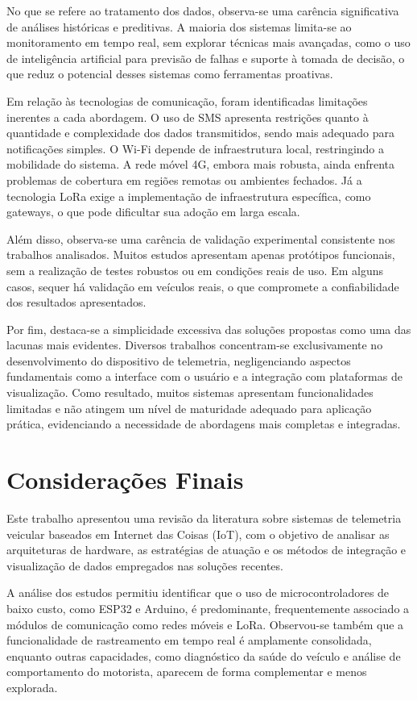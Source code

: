 \documentclass[
	article,			%
	11pt,				%
	oneside,			%
	a4paper,			%
	english,			%
	brazil,				%
	sumario=tradicional
	]{abntex2}
\begin{document}
No que se refere ao tratamento dos dados, observa-se uma carência significativa de análises históricas e preditivas. A maioria dos sistemas limita-se ao monitoramento em tempo real, sem explorar técnicas mais avançadas, como o uso de inteligência artificial para previsão de falhas e suporte à tomada de decisão, o que reduz o potencial desses sistemas como ferramentas proativas.

Em relação às tecnologias de comunicação, foram identificadas limitações inerentes a cada abordagem. O uso de SMS apresenta restrições quanto à quantidade e complexidade dos dados transmitidos, sendo mais adequado para notificações simples. O Wi-Fi depende de infraestrutura local, restringindo a mobilidade do sistema. A rede móvel 4G, embora mais robusta, ainda enfrenta problemas de cobertura em regiões remotas ou ambientes fechados. Já a tecnologia LoRa exige a implementação de infraestrutura específica, como gateways, o que pode dificultar sua adoção em larga escala.

Além disso, observa-se uma carência de validação experimental consistente nos trabalhos analisados. Muitos estudos apresentam apenas protótipos funcionais, sem a realização de testes robustos ou em condições reais de uso. Em alguns casos, sequer há validação em veículos reais, o que compromete a confiabilidade dos resultados apresentados.

Por fim, destaca-se a simplicidade excessiva das soluções propostas como uma das lacunas mais evidentes. Diversos trabalhos concentram-se exclusivamente no desenvolvimento do dispositivo de telemetria, negligenciando aspectos fundamentais como a interface com o usuário e a integração com plataformas de visualização. Como resultado, muitos sistemas apresentam funcionalidades limitadas e não atingem um nível de maturidade adequado para aplicação prática, evidenciando a necessidade de abordagens mais completas e integradas.

\section{Considerações Finais}

Este trabalho apresentou uma revisão da literatura sobre sistemas de telemetria veicular baseados em Internet das Coisas (IoT), com o objetivo de analisar as arquiteturas de hardware, as estratégias de atuação e os métodos de integração e visualização de dados empregados nas soluções recentes.

A análise dos estudos permitiu identificar que o uso de microcontroladores de baixo custo, como ESP32 e Arduino, é predominante, frequentemente associado a módulos de comunicação como redes móveis e LoRa. Observou-se também que a funcionalidade de rastreamento em tempo real é amplamente consolidada, enquanto outras capacidades, como diagnóstico da saúde do veículo e análise de comportamento do motorista, aparecem de forma complementar e menos explorada.
\end{document}
